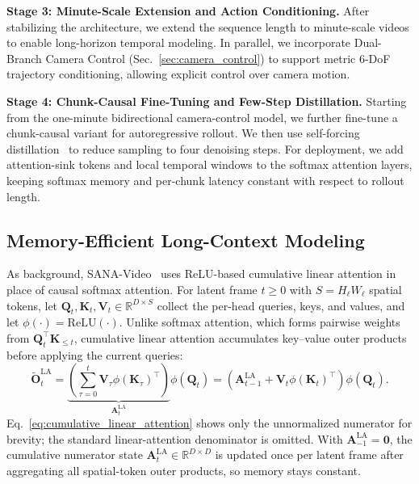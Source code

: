 \noindent\textbf{Stage 3: Minute-Scale Extension and Action Conditioning.} 
After stabilizing the architecture, we extend the sequence length to minute-scale videos to enable long-horizon temporal modeling. In parallel, we incorporate Dual-Branch Camera Control (Sec.~\ref{sec:camera_control}) to support metric 6-DoF trajectory conditioning, allowing explicit control over camera motion.

\noindent\textbf{Stage 4: Chunk-Causal Fine-Tuning and Few-Step Distillation.}
Starting from the one-minute bidirectional camera-control model, we further fine-tune a chunk-causal variant for autoregressive rollout.
We then use self-forcing distillation~\citep{huang2024selfforcing} to reduce sampling to four denoising steps.
For deployment, we add attention-sink tokens and local temporal windows to the softmax attention layers, keeping softmax memory and per-chunk latency constant with respect to rollout length.

\subsection{Memory-Efficient Long-Context Modeling}
\label{sec:long_context_modeling}

As background, SANA-Video~\citep{chen2025sana} uses ReLU-based cumulative linear attention in place of causal softmax attention.
For latent frame $t\ge0$ with $S=H_\ell W_\ell$ spatial tokens, let $\mathbf{Q}_t,\mathbf{K}_t,\mathbf{V}_t\in\mathbb{R}^{D\times S}$ collect the per-head queries, keys, and values, and let $\phi(\cdot)=\mathrm{ReLU}(\cdot)$.
Unlike softmax attention, which forms pairwise weights from $\mathbf{Q}_t^\top\mathbf{K}_{\le t}$, cumulative linear attention accumulates key--value outer products before applying the current queries:
{\small
\begin{equation}
\label{eq:cumulative_linear_attention}
\widetilde{\mathbf{O}}^{\mathrm{LA}}_t
=
\underbrace{\left(\sum_{\tau=0}^{t}\mathbf{V}_\tau\phi(\mathbf{K}_\tau)^\top\right)}_{\mathbf{A}^{\mathrm{LA}}_t}
\phi(\mathbf{Q}_t)
=
\left(\mathbf{A}^{\mathrm{LA}}_{t-1}+\mathbf{V}_t\phi(\mathbf{K}_t)^\top\right)\phi(\mathbf{Q}_t).
\end{equation}
}
Eq.~\ref{eq:cumulative_linear_attention} shows only the unnormalized numerator for brevity; the standard linear-attention denominator is omitted.
With $\mathbf{A}^{\mathrm{LA}}_{-1}=\mathbf{0}$, the cumulative numerator state $\mathbf{A}^{\mathrm{LA}}_t\in\mathbb{R}^{D\times D}$ is updated once per latent frame after aggregating all spatial-token outer products, so memory stays constant.

